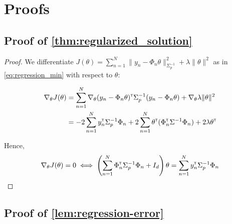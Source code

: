 \documentclass{article}
\begin{document}



\appendix

\section{Proofs}

\subsection{Proof of \autoref{thm:regularized_solution}}

\begin{proof}
We differentiate $J(\theta) = \sum_{n=1}^N \|y_n -\Phi_n\theta\|_{\Sigma_p^{-1}}^2 + \lambda\|\theta\|_{}^2$ as in  \eqref{eq:regression_min} with respect to $\theta$:

\begin{align*}
    \nabla_{\theta} J(\theta) &= \sum_{n=1}^N\nabla_{\theta} (y_n - \Phi_n\theta)^{\mathsf{\scriptscriptstyle T}}\Sigma_p^{-1}(y_n - \Phi_n\theta) + \nabla_{\theta} \lambda\|\theta\|_{}^2\\
    &= -2\sum_{n=1}^N y_n^{\mathsf{\scriptscriptstyle T}}\Sigma_p^{-1}\Phi_n + 2\sum_{n=1}^N\theta^{\mathsf{\scriptscriptstyle T}}(\Phi_n^{\mathsf{\scriptscriptstyle T}}\Sigma^{-1}\Phi_n) +  2 \lambda \theta^{\mathsf{\scriptscriptstyle T}}
\end{align*}

Hence,
\begin{align*}
    \nabla_{\theta} J(\theta) = 0 \iff \left(\sum_{n=1}^N\Phi_n^{\mathsf{\scriptscriptstyle T}}\Sigma_p^{-1}\Phi_n + I_d\right)\theta = \sum_{n=1}^N y_n^{\mathsf{\scriptscriptstyle T}}\Sigma_p^{-1}\Phi_n
\end{align*}
\end{proof}

\subsection{Proof of \autoref{lem:regression-error}}
\end{document}
